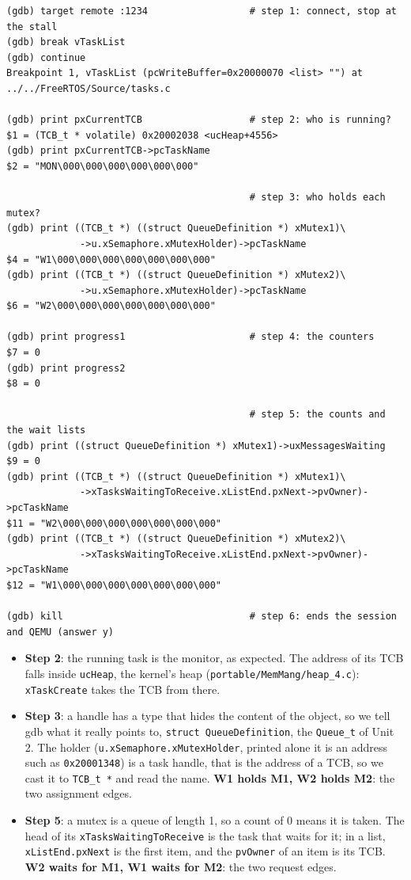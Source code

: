 {\verbatimscriptsize
\begin{verbatim}
(gdb) target remote :1234                  # step 1: connect, stop at the stall
(gdb) break vTaskList
(gdb) continue
Breakpoint 1, vTaskList (pcWriteBuffer=0x20000070 <list> "") at ../../FreeRTOS/Source/tasks.c

(gdb) print pxCurrentTCB                   # step 2: who is running?
$1 = (TCB_t * volatile) 0x20002038 <ucHeap+4556>
(gdb) print pxCurrentTCB->pcTaskName
$2 = "MON\000\000\000\000\000\000"

                                           # step 3: who holds each mutex?
(gdb) print ((TCB_t *) ((struct QueueDefinition *) xMutex1)\
             ->u.xSemaphore.xMutexHolder)->pcTaskName
$4 = "W1\000\000\000\000\000\000\000"
(gdb) print ((TCB_t *) ((struct QueueDefinition *) xMutex2)\
             ->u.xSemaphore.xMutexHolder)->pcTaskName
$6 = "W2\000\000\000\000\000\000\000"

(gdb) print progress1                      # step 4: the counters
$7 = 0
(gdb) print progress2
$8 = 0

                                           # step 5: the counts and the wait lists
(gdb) print ((struct QueueDefinition *) xMutex1)->uxMessagesWaiting
$9 = 0
(gdb) print ((TCB_t *) ((struct QueueDefinition *) xMutex1)\
             ->xTasksWaitingToReceive.xListEnd.pxNext->pvOwner)->pcTaskName
$11 = "W2\000\000\000\000\000\000\000"
(gdb) print ((TCB_t *) ((struct QueueDefinition *) xMutex2)\
             ->xTasksWaitingToReceive.xListEnd.pxNext->pvOwner)->pcTaskName
$12 = "W1\000\000\000\000\000\000\000"

(gdb) kill                                 # step 6: ends the session and QEMU (answer y)
\end{verbatim}}
\begin{itemize}
    \item \textbf{Step 2}: the running task is the monitor, as expected. The address of its TCB falls inside \texttt{ucHeap}, the kernel's heap (\texttt{portable/\allowbreak MemMang/\allowbreak heap\_4.c}): \texttt{xTaskCreate} takes the TCB from there.
    \item \textbf{Step 3}: a handle has a type that hides the content of the object, so we tell gdb what it really points to, \texttt{struct QueueDefinition}, the \texttt{Queue\_t} of Unit 2. The holder (\texttt{u.xSemaphore.xMutexHolder}, printed alone it is an address such as \texttt{0x20001348}) is a task handle, that is the address of a TCB, so we cast it to \texttt{TCB\_t *} and read the name. \textbf{W1 holds M1, W2 holds M2}: the two assignment edges.
    \item \textbf{Step 5}: a mutex is a queue of length 1, so a count of 0 means it is taken. The head of its \texttt{xTasksWaitingToReceive} is the task that waits for it; in a list, \texttt{xListEnd.pxNext} is the first item, and the \texttt{pvOwner} of an item is its TCB. \textbf{W2 waits for M1, W1 waits for M2}: the two request edges.
\end{itemize}
